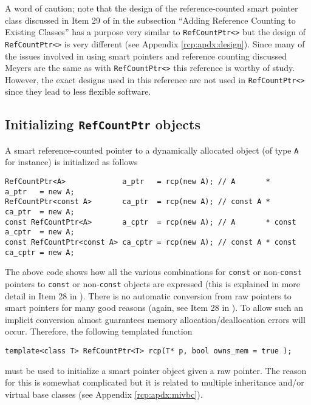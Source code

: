 A word of caution; note that the design of the reference-counted smart
pointer class discussed in Item 29 of {}\cite{ref:meyers_1996} in the
subsection ``Adding Reference Counting to Existing Classes'' has a
purpose very similar to {}\texttt{Ref\-Count\-Ptr<>} but the design of
{}\texttt{Ref\-Count\-Ptr<>} is very different (see Appendix
{}\ref{rcp:apdx:design}).  Since many of the issues involved in using
smart pointers and reference counting discussed Meyers
{}\cite{ref:meyers_1996} are the same as with {}\texttt{Ref\-Count\-Ptr<>}
this reference is worthy of study.  However, the exact designs used in
this reference are not used in {}\texttt{Ref\-Count\-Ptr<>} since they
lead to less flexible software.

%
\subsection{Initializing {}\texttt{RefCountPtr} objects}
\label{rcp:sec:init-rcp-objects}
%

A smart reference-counted pointer to a dynamically allocated object
(of type {}\texttt{A} for instance) is initialized as follows

{\scriptsize\begin{verbatim}
RefCountPtr<A>             a_ptr   = rcp(new A); // A       *       a_ptr   = new A;
RefCountPtr<const A>       ca_ptr  = rcp(new A); // const A *       ca_ptr  = new A;
const RefCountPtr<A>       a_cptr  = rcp(new A); // A       * const a_cptr  = new A;
const RefCountPtr<const A> ca_cptr = rcp(new A); // const A * const ca_cptr = new A;
\end{verbatim}}

The above code shows how all the various combinations for
{}\texttt{const} or non-{}\texttt{const} pointers to {}\texttt{const}
or non-{}\texttt{const} objects are expressed (this is explained in
more detail in Item 28 in {}\cite{ref:meyers_1996}).  There is no
automatic conversion from raw pointers to smart pointers for many good
reasons (again, see Item 28 in {}\cite{ref:meyers_1996}).  To allow such
an implicit conversion almost guarantees memory
allocation/deallocation errors will occur.  Therefore, the following
templated function

{\scriptsize\begin{verbatim}
template<class T> RefCountPtr<T> rcp(T* p, bool owns_mem = true );
\end{verbatim}}

{}\noindent{}must be used to initialize a smart pointer object given a
raw pointer.  The reason for this is somewhat complicated but it is
related to multiple inheritance and/or virtual base classes (see
Appendix {}\ref{rcp:apdx:mivbc}).

